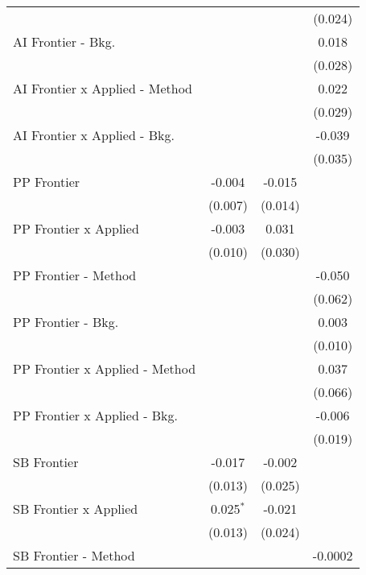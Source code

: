\begin{tabular}{lccc}
                                  &               &         & (0.024)\\   
   AI Frontier - Bkg.             &               &         & 0.018\\   
                                  &               &         & (0.028)\\   
   AI Frontier x Applied - Method &               &         & 0.022\\   
                                  &               &         & (0.029)\\   
   AI Frontier x Applied - Bkg.   &               &         & -0.039\\   
                                  &               &         & (0.035)\\   
   PP Frontier                    & -0.004        & -0.015  &   \\   
                                  & (0.007)       & (0.014) &   \\   
   PP Frontier x Applied          & -0.003        & 0.031   &   \\   
                                  & (0.010)       & (0.030) &   \\   
   PP Frontier - Method           &               &         & -0.050\\   
                                  &               &         & (0.062)\\   
   PP Frontier - Bkg.             &               &         & 0.003\\   
                                  &               &         & (0.010)\\   
   PP Frontier x Applied - Method &               &         & 0.037\\   
                                  &               &         & (0.066)\\   
   PP Frontier x Applied - Bkg.   &               &         & -0.006\\   
                                  &               &         & (0.019)\\   
   SB Frontier                    & -0.017        & -0.002  &   \\   
                                  & (0.013)       & (0.025) &   \\   
   SB Frontier x Applied          & 0.025$^{*}$   & -0.021  &   \\   
                                  & (0.013)       & (0.024) &   \\   
   SB Frontier - Method           &               &         & -0.0002\\   

\end{tabular}
